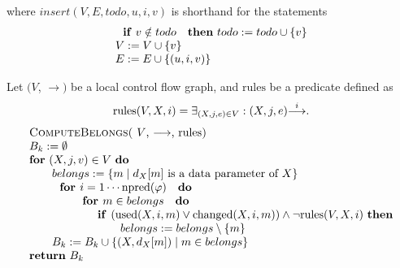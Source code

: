 where $insert(V,E,todo,u,i,v)$ is shorthand for the statements%
\begin{equation*}
\begin{array}{l}
\text{\textbf{if} }v\notin todo\text{ \textbf{then} }todo:=todo\cup \{v\} \\ 
V:=V\cup \{v\} \\ 
E:=E\cup \{(u,i,v)\}%
\end{array}%
\end{equation*}%
\newpage

Let $(V$, $\mathrm{\longrightarrow })$ be a local control flow graph, and $%
\mathrm{rules}$ be a predicate defined as%
\begin{equation*}
\mathrm{rules}(V,X,i)=\exists _{(X,j,e)\in V}:(X,j,e)\overset{i}{\mathrm{%
\longrightarrow }}.
\end{equation*}%
\begin{equation*}
\begin{tabular}{l}
\textsc{ComputeBelongs(} $V$, $\mathrm{\longrightarrow }$, $\mathrm{rules}$%
\textsc{)} \\ 
$B_{k}:=\emptyset $ \\ 
\textbf{for} $(X,j,v)\in V$ \textbf{do} \\ 
$\qquad belongs:=\{m\mid d_{X}[m]$ is a data parameter of $X\}$ \\ 
$\qquad \text{\textbf{for }}i=1\cdots \mathrm{npred}(\varphi )\text{ \textbf{%
do}}$ \\ 
$\qquad \qquad \text{\textbf{for }}m\in belongs\text{ \textbf{do}}$ \\ 
$\qquad \qquad \qquad $\textbf{if }$\left( \mathrm{used}(X,i,m)\vee \mathrm{%
changed}(X,i,m)\right) \wedge \lnot \mathrm{rules}(V,X,i)$ \textbf{then} \\ 
$\qquad \qquad \qquad \qquad belongs:=belongs\setminus \{m\}$ \\ 
$\qquad B_{k}:=B_{k}\cup \{(X,d_{X}[m])\mid m\in belongs\}$ \\ 
\textbf{return} $B_{k}$%
\end{tabular}%
\end{equation*}%
